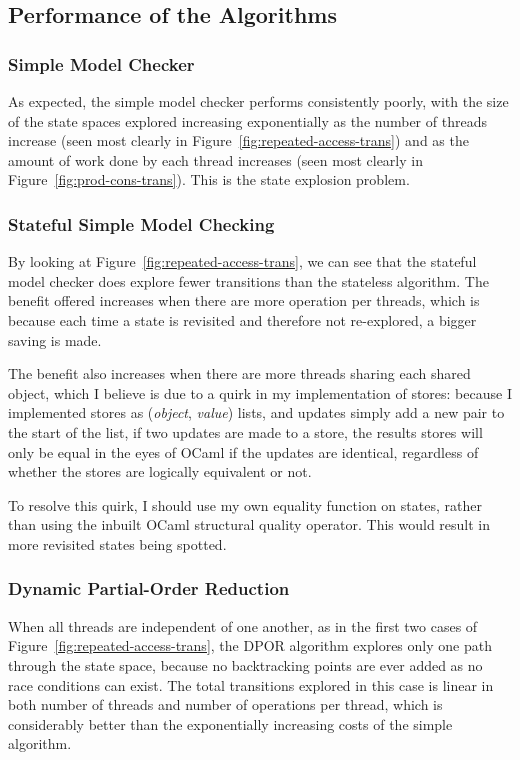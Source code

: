 \documentclass[12pt,a4paper,twoside,openright]{report}
\begin{document}
\subsection{Performance of the Algorithms}

\subsubsection{Simple Model Checker}
As expected, the simple model checker performs
consistently poorly, with the size of the state
spaces explored increasing exponentially as
the number of threads increase (seen most
clearly in Figure~\ref{fig:repeated-access-trans})
and as the amount of work done by each thread
increases (seen most clearly in
Figure~\ref{fig:prod-cons-trans}).
This is the state explosion problem.

\subsubsection{Stateful Simple Model Checking}
By looking at Figure~\ref{fig:repeated-access-trans},
we can see that the stateful model checker does
explore fewer transitions than the stateless
algorithm. The benefit offered increases
when there are more operation per threads,
which is because each time a state is
revisited and therefore not re-explored,
a bigger saving is made.

The benefit also increases when there are more
threads sharing each shared object, which I
believe is due to a quirk in my implementation
of stores: because I implemented stores as
(\textit{object}, \textit{value}) lists,
and updates simply
add a new pair to the start of the list,
if two updates are made to a store, the
results stores will only be equal in
the eyes of OCaml if the updates are
identical, regardless of whether the
stores are logically equivalent or not.

To resolve this quirk, I should use
my own equality function on states,
rather than using the inbuilt
OCaml structural quality operator.
This would result in more
revisited states being spotted.

\subsubsection{Dynamic Partial-Order Reduction}
When all threads are independent of one another,
as in the first two cases of
Figure~\ref{fig:repeated-access-trans},
the DPOR algorithm explores only one path
through the state space, because no
backtracking points are ever added as
no race conditions can exist. The total
transitions explored in this case is linear in both
number of threads and number of operations
per thread, which is considerably better
than the exponentially increasing costs
of the simple algorithm.
\end{document}
